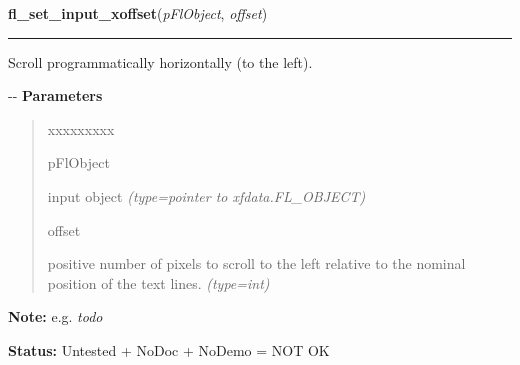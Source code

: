 \hspace{.8\funcindent}\begin{boxedminipage}{\funcwidth}

    \raggedright \textbf{fl\_set\_input\_xoffset}(\textit{pFlObject}, \textit{offset})

    \vspace{-1.5ex}

    \rule{\textwidth}{0.5\fboxrule}
\setlength{\parskip}{2ex}

Scroll programmatically horizontally (to the left).

-{}-
\setlength{\parskip}{1ex}
      \textbf{Parameters}
      \vspace{-1ex}

      \begin{quote}
        \begin{Ventry}{xxxxxxxxx}

          \item[pFlObject]


input object
            {\it (type=pointer to xfdata.FL\_OBJECT)}

          \item[offset]


positive number of pixels to scroll to the left relative to the
nominal position of the text lines.
            {\it (type=int)}

        \end{Ventry}

      \end{quote}

\textbf{Note:} 
e.g. \emph{todo}


\textbf{Status:} 
Untested + NoDoc + NoDemo = NOT OK


    \end{boxedminipage}

    \label{xformslib:flinput:fl_get_input_xoffset}

    \vspace{0.5ex}

